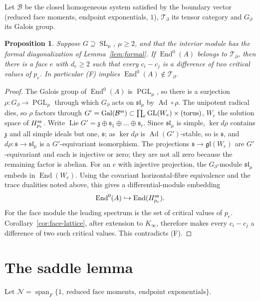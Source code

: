 \documentclass[11pt]{article}
\numberwithin{equation}{section}
\newtheorem{proposition}[theorem]{Proposition}
\theoremstyle{definition}
\theoremstyle{remark}
\newcommand{\SL}{\operatorname{SL}}\newcommand{\GL}{\operatorname{GL}}\newcommand{\PGL}{\operatorname{PGL}}
\newcommand{\End}{\operatorname{End}}\newcommand{\Hom}{\operatorname{Hom}}\newcommand{\Span}{\operatorname{span}}
\newcommand{\Lie}{\operatorname{Lie}}\newcommand{\Gal}{\operatorname{Gal}}\newcommand{\wt}{\operatorname{wt}}
\newcommand{\Ncal}{\mathcal N}\newcommand{\Tcal}{\mathcal T}\newcommand{\Bcal}{\mathcal B}
\begin{document}
Let $\Bcal$ be the closed homogeneous system satisfied by the boundary vector
(reduced face moments, endpoint exponentials, $1$), $\Tcal_\partial$ its tensor
category and $G_\partial$ its Galois group.

\begin{proposition}\label{prop:faces}
Suppose $G\supseteq\SL_\mu$, $\mu\ge2$, and that the interior module
has the formal diagonalization of Lemma~\ref{lem:formal}. If $\End^0(A)$
belongs to $\Tcal_\partial$, then there is a face $e$ with $d_e\ge2$ such that
every $c_i-c_j$ is a difference of two critical values of $p_e$. In particular
\textup{(F)} implies $\End^0(A)\notin\Tcal_\partial$.
\end{proposition}
\begin{proof}
The Galois group of $\End^0(A)$ is $\PGL_\mu$, so there is a surjection
$\rho:G_\partial\to\PGL_\mu$ through which $G_\partial$ acts on
$\mathfrak{sl}_\mu$ by $\operatorname{Ad}\circ\rho$. The unipotent radical dies,
so $\rho$ factors through $G'=\Gal(\Bcal^{\rm ss})\subset\prod_e\GL(W_e)\times(\text{torus})$,
$W_e$ the solution space of $H_{p_e}^{\rm ss}$. Write
$\Lie G'=\mathfrak z\oplus\mathfrak s_1\oplus\dots\oplus\mathfrak s_r$. Since
$\mathfrak{sl}_\mu$ is simple, $\ker d\rho$ contains $\mathfrak z$ and all simple
ideals but one, $\mathfrak s$; as $\ker d\rho$ is $\operatorname{Ad}(G')$-stable,
so is $\mathfrak s$, and $d\rho:\mathfrak s\to\mathfrak{sl}_\mu$ is a
$G'$-equivariant isomorphism. The projections
$\mathfrak s\to\mathfrak{gl}(W_e)$ are $G'$-equivariant and each is injective or
zero; they are not all zero because the remaining factor is abelian. For an
$e$ with injective projection, the $G_\partial$-module $\mathfrak{sl}_\mu$ embeds
in $\End(W_e)$. Using the covariant horizontal-fibre equivalence and the trace dualities
noted above, this gives a differential-module embedding
\[
 \End^0(A)\hookrightarrow\End(H_{p_e}^{\rm ss}).
\]
For the face module the leading spectrum is the set of critical values of
$p_e$. Corollary~\ref{cor:face-lattice}, after extension to $K_\infty$,
therefore makes every $c_i-c_j$ a difference of two such critical values.
This contradicts (F).
\end{proof}

\section{The saddle lemma}

Let $\Ncal=\Span_F\{1,\ \text{reduced face moments},\ \text{endpoint exponentials}\}$.
\end{document}
